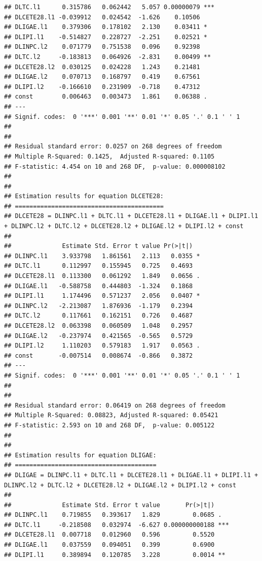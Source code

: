 \documentclass[
]{book}
\begin{document}
\begin{verbatim}
## DLTC.l1      0.315786   0.062442   5.057 0.00000079 ***
## DLCETE28.l1 -0.039912   0.024542  -1.626    0.10506    
## DLIGAE.l1    0.379306   0.178102   2.130    0.03411 *  
## DLIPI.l1    -0.514827   0.228727  -2.251    0.02521 *  
## DLINPC.l2    0.071779   0.751538   0.096    0.92398    
## DLTC.l2     -0.183813   0.064926  -2.831    0.00499 ** 
## DLCETE28.l2  0.030125   0.024228   1.243    0.21481    
## DLIGAE.l2    0.070713   0.168797   0.419    0.67561    
## DLIPI.l2    -0.166610   0.231909  -0.718    0.47312    
## const        0.006463   0.003473   1.861    0.06388 .  
## ---
## Signif. codes:  0 '***' 0.001 '**' 0.01 '*' 0.05 '.' 0.1 ' ' 1
## 
## 
## Residual standard error: 0.0257 on 268 degrees of freedom
## Multiple R-Squared: 0.1425,  Adjusted R-squared: 0.1105 
## F-statistic: 4.454 on 10 and 268 DF,  p-value: 0.000008102 
## 
## 
## Estimation results for equation DLCETE28: 
## ========================================= 
## DLCETE28 = DLINPC.l1 + DLTC.l1 + DLCETE28.l1 + DLIGAE.l1 + DLIPI.l1 + DLINPC.l2 + DLTC.l2 + DLCETE28.l2 + DLIGAE.l2 + DLIPI.l2 + const 
## 
##              Estimate Std. Error t value Pr(>|t|)  
## DLINPC.l1    3.933798   1.861561   2.113   0.0355 *
## DLTC.l1      0.112997   0.155945   0.725   0.4693  
## DLCETE28.l1  0.113300   0.061292   1.849   0.0656 .
## DLIGAE.l1   -0.588758   0.444803  -1.324   0.1868  
## DLIPI.l1     1.174496   0.571237   2.056   0.0407 *
## DLINPC.l2   -2.213087   1.876936  -1.179   0.2394  
## DLTC.l2      0.117661   0.162151   0.726   0.4687  
## DLCETE28.l2  0.063398   0.060509   1.048   0.2957  
## DLIGAE.l2   -0.237974   0.421565  -0.565   0.5729  
## DLIPI.l2     1.110203   0.579183   1.917   0.0563 .
## const       -0.007514   0.008674  -0.866   0.3872  
## ---
## Signif. codes:  0 '***' 0.001 '**' 0.01 '*' 0.05 '.' 0.1 ' ' 1
## 
## 
## Residual standard error: 0.06419 on 268 degrees of freedom
## Multiple R-Squared: 0.08823, Adjusted R-squared: 0.05421 
## F-statistic: 2.593 on 10 and 268 DF,  p-value: 0.005122 
## 
## 
## Estimation results for equation DLIGAE: 
## ======================================= 
## DLIGAE = DLINPC.l1 + DLTC.l1 + DLCETE28.l1 + DLIGAE.l1 + DLIPI.l1 + DLINPC.l2 + DLTC.l2 + DLCETE28.l2 + DLIGAE.l2 + DLIPI.l2 + const 
## 
##              Estimate Std. Error t value       Pr(>|t|)    
## DLINPC.l1    0.719855   0.393617   1.829         0.0685 .  
## DLTC.l1     -0.218508   0.032974  -6.627 0.000000000188 ***
## DLCETE28.l1  0.007718   0.012960   0.596         0.5520    
## DLIGAE.l1    0.037559   0.094051   0.399         0.6900    
## DLIPI.l1     0.389894   0.120785   3.228         0.0014 ** 

\end{verbatim}
\end{document}
